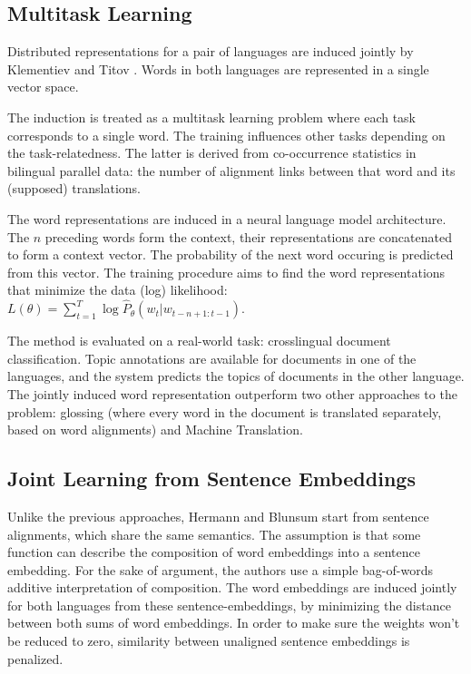 \subsection{Multitask Learning}
Distributed representations for a pair of languages are induced jointly by Klementiev and Titov \cite{klementiev2012inducing}. Words in both languages are represented in a single vector space.

The induction is treated as a multitask learning problem where each task corresponds to a single word. The training influences other tasks depending on the task-relatedness. The latter is derived from co-occurrence statistics in bilingual parallel data: the number of alignment links between  that word and its (supposed) translations. 

The word representations are induced in a neural language model architecture. 
The $n$ preceding words form the context, their representations are concatenated to form a context vector. The probability of the next word occuring is predicted from this vector. The training procedure aims to find the word representations that minimize the data (log) likelihood: 
$L(\theta) = \sum_{t=1}^T \log \hat{P}_\theta (w_t|w_{t-n+1:t-1})$. 

The method is evaluated on a real-world task: crosslingual document classification. Topic annotations are available for documents in one of the languages, and the system predicts the topics of documents in the other language. The jointly induced word representation outperform two other approaches to the problem: glossing (where every word in the document is translated separately, based on word alignments) and Machine Translation.


\subsection{Joint Learning from Sentence Embeddings}
Unlike the previous approaches, Hermann and Blunsum \cite{hermann2013multilingual} start from sentence alignments, which share the same semantics.
The assumption is that some function can describe the composition of word embeddings into a sentence embedding.
For the sake of argument, the authors use a simple bag-of-words additive interpretation of composition. 
The word embeddings are induced jointly for both languages from these sentence-embeddings, by minimizing the distance between both sums of word embeddings.
In order to make sure the weights won't be reduced to zero, similarity between unaligned sentence embeddings is penalized.

